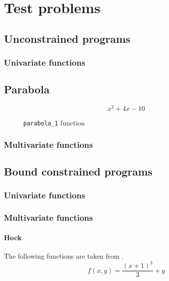 \chapter{Test problems}

\section{Unconstrained programs}

\subsection{Univariate functions}

\section{Parabola}

\[
x^2+4x-10
\]

\begin{figure}[htb]
\begin{center}
\begin{small}

\end{small}
\end{center}
\caption{\texttt{parabola\_1} function}
\label{fig:parabola_1}
\end{figure}

\subsection{Multivariate functions}

\section{Bound constrained programs}

\subsection{Univariate functions}

\subsection{Multivariate functions}

\subsubsection{Hock}

The following functions are taken from \cite{HockSchi81}.
\[
f(x,y) = \frac{(x+1)^3}{3}+y
\]


